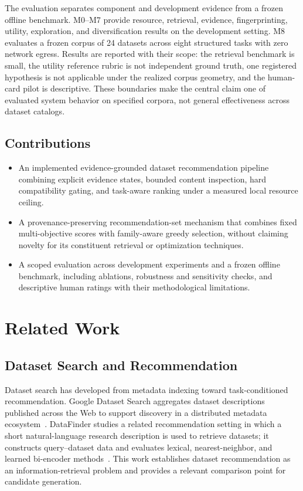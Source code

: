 \documentclass[conference]{IEEEtran}
\begin{document}
The evaluation separates component and development evidence from a frozen offline benchmark. M0--M7 provide resource, retrieval, evidence, fingerprinting, utility, exploration, and diversification results on the development setting. M8 evaluates a frozen corpus of 24 datasets across eight structured tasks with zero network egress. Results are reported with their scope: the retrieval benchmark is small, the utility reference rubric is not independent ground truth, one registered hypothesis is not applicable under the realized corpus geometry, and the human-card pilot is descriptive. These boundaries make the central claim one of evaluated system behavior on specified corpora, not general effectiveness across dataset catalogs.

\subsection{Contributions}
\begin{itemize}
  \item An implemented evidence-grounded dataset recommendation pipeline combining explicit evidence states, bounded content inspection, hard compatibility gating, and task-aware ranking under a measured local resource ceiling.
  \item A provenance-preserving recommendation-set mechanism that combines fixed multi-objective scores with family-aware greedy selection, without claiming novelty for its constituent retrieval or optimization techniques.
  \item A scoped evaluation across development experiments and a frozen offline benchmark, including ablations, robustness and sensitivity checks, and descriptive human ratings with their methodological limitations.
\end{itemize}

\section{Related Work}
\subsection{Dataset Search and Recommendation}
Dataset search has developed from metadata indexing toward task-conditioned recommendation. Google Dataset Search aggregates dataset descriptions published across the Web to support discovery in a distributed metadata ecosystem~\cite{noy2019googledatasetsearch}. DataFinder studies a related recommendation setting in which a short natural-language research description is used to retrieve datasets; it constructs query--dataset data and evaluates lexical, nearest-neighbor, and learned bi-encoder methods~\cite{viswanathan2023datafinder}. This work establishes dataset recommendation as an information-retrieval problem and provides a relevant comparison point for candidate generation.
\end{document}
